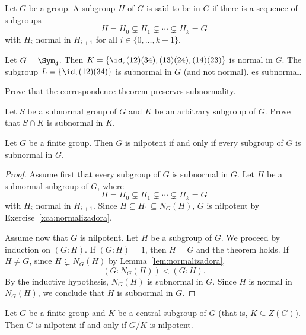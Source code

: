 \begin{definition}
	Let $G$ be a group. A subgroup $H$ of $G$ is said to be  in $G$ if there is a sequence 
    of subgroups 
	\[
		H=H_0\subsetneq H_1\subsetneq\cdots\subsetneq H_k=G		
	\]
	with $H_i$ normal in $H_{i+1}$ for all $i\in\{0,\dots,k-1\}$. 
\end{definition}

\begin{example}
	Let $G=\Sym_4$. Then $K=\{\id,(12)(34),(13)(24),(14)(23)\}$ is normal in $G$. 
	The subgroup $L=\{\id,(12)(34)\}$ is subnormal in $G$ (and not normal). 
	es subnormal. 
\end{example}

\begin{exercise}
\label{xca:correspondence_subnormality}
    Prove that the correspondence theorem preserves subnormality. 
\end{exercise}

\begin{exercise}
\label{xca:subnormal_intersection}
    Let $S$ be a subnormal group of $G$ and $K$ be an arbitrary subgroup of $G$. 
    Prove that $S\cap K$ is subnormal in $K$. 
\end{exercise}

\begin{theorem}
	\label{thm:subnormal}
	Let $G$ be a finite group. Then $G$ is nilpotent if and only if every subgroup of $G$ is subnormal in $G$. 
\end{theorem}

\begin{proof}
	Assume first that every subgroup of $G$ is subnormal in $G$. Let $H$ be a subnormal subgroup of $G$, where 
	\[
		H=H_0\subsetneq H_1\subsetneq\cdots\subsetneq H_k=G
	\]
	with $H_i$ normal in $H_{i+1}$. Since $H\subsetneq H_1\subseteq N_G(H)$, 
	$G$ is nilpotent by Exercise~\ref{xca:normalizadora}.

	Assume now that $G$ is nilpotent. Let $H$ be a subgroup of $G$.
	We proceed by induction on $(G:H)$. If $(G:H)=1$, then $H=G$ and the theorem holds. If 
	$H\ne G$, since $H\subsetneq N_G(H)$ by Lemma~\ref{lem:normalizadora}, 
	\[
		(G:N_G(H))<(G:H).
	\]
	By the inductive hypothesis, $N_G(H)$ is subnormal in $G$. Since $H$ is 
	normal in $N_G(H)$, we conclude that $H$ is subnormal in $G$.
\end{proof}


\begin{corollary}
	Let $G$ be a finite group and $K$ be a central subgroup of $G$ (that is, $K\subseteq Z(G)$).
	Then $G$ is nilpotent if and only if $G/K$ is nilpotent. 
\end{corollary}

